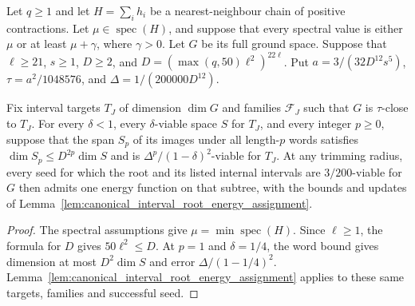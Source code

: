 \begin{lemma}
    \label{lem:calibrated_root_energy}
    \leanok
    Let $q\ge1$ and let $H=\sum_i h_i$ be a nearest-neighbour chain
    of positive contractions. Let $\mu\in\operatorname{spec}(H)$, and suppose that
    every spectral value is either $\mu$ or at least $\mu+\gamma$,
    where $\gamma>0$. Let $G$ be its full ground space. Suppose that
    $\ell\ge21$, $s\ge1$, $D\ge2$, and
    $D=(\max(q,50)\ell^2)^{22\ell}$.
    Put $a=3/(32D^{12}s^5)$, $\tau=a^2/1048576$, and
    $\Delta=1/(200000D^{12})$.

    Fix interval targets $T_J$ of dimension $\dim G$ and families
    $\mathcal F_J$ such that $G$ is $\tau$-close to $T_J$.
    For every $\delta<1$, every $\delta$-viable space $S$ for $T_J$,
    and every integer $p\ge0$, suppose that the span $S_p$ of its
    images under all length-$p$ words satisfies
    $\dim S_p\le D^{2p}\dim S$ and is
    $\Delta^p/(1-\delta)^2$-viable for $T_J$.
    At any trimming radius, every seed for which the root and its listed internal intervals
    are $3/200$-viable for $G$ then admits one energy function on
    that subtree, with the bounds and updates of
    Lemma~\ref{lem:canonical_interval_root_energy_assignment}.
\end{lemma}
\begin{proof}\leanok
    The spectral assumptions give $\mu=\min\operatorname{spec}(H)$.
    Since $\ell\ge1$, the formula for $D$ gives $50\ell^2\le D$.
    At $p=1$ and $\delta=1/4$, the word bound gives dimension
    at most $D^2\dim S$ and error $\Delta/(1-1/4)^2$.
    Lemma~\ref{lem:canonical_interval_root_energy_assignment} applies
    to these same targets, families and successful seed.
\end{proof}


